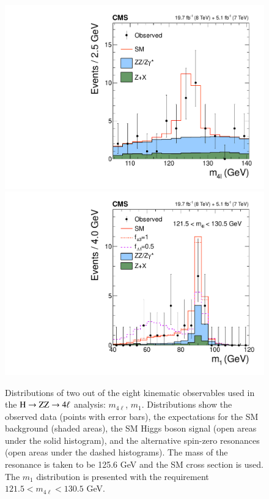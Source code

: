 \begin{figure}[!p]
\begin{center}
\centerline{
\includegraphics[width=0.50\linewidth]{figures/cCompare_DataMC_AllTeV_ZZMass.pdf}
\includegraphics[width=0.50\linewidth]{figures/cCompare_DataMC_AllTeV_Z1Mass_SignalEnriched.pdf}
}
\caption{ Distributions of two out of the eight kinematic observables
  used in the $\mathrm{H}\to\mathrm{Z}\mathrm{Z}\to4\ell$ analysis: $m_{4\ell}$, $m_1$.  Distributions
  show the observed data (points with error bars), the expectations
  for the SM background (shaded areas), the SM Higgs boson signal
  (open areas under the solid histogram), and the alternative
  spin-zero resonances (open areas under the dashed histograms).  The
  mass of the resonance is taken to be 125.6 GeV and the SM cross
  section is used.  The $m_1$ distribution is presented with the
  requirement $121.5 < m_{4\ell} < 130.5$ GeV.  
\label{fig:hzzkinematics} }
\end{center}
\end{figure}

